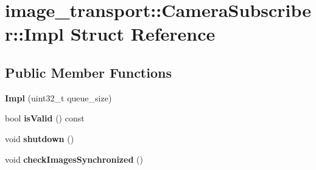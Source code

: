 \hypertarget{structimage__transport_1_1_camera_subscriber_1_1_impl}{\section{image\-\_\-transport\-:\-:Camera\-Subscriber\-:\-:Impl Struct Reference}
\label{structimage__transport_1_1_camera_subscriber_1_1_impl}
}
\subsection*{Public Member Functions}
\begin{DoxyCompactItemize}
\item 
\hypertarget{structimage__transport_1_1_camera_subscriber_1_1_impl_ac7966fd63c4fceb7933a97435d498530}{{\bfseries Impl} (uint32\-\_\-t queue\-\_\-size)}\label{structimage__transport_1_1_camera_subscriber_1_1_impl_ac7966fd63c4fceb7933a97435d498530}

\item 
\hypertarget{structimage__transport_1_1_camera_subscriber_1_1_impl_a81101052d6963d6dae362a8618834891}{bool {\bfseries is\-Valid} () const }\label{structimage__transport_1_1_camera_subscriber_1_1_impl_a81101052d6963d6dae362a8618834891}

\item 
\hypertarget{structimage__transport_1_1_camera_subscriber_1_1_impl_a1d85a3f8e64041505fc74f8057ec3dfd}{void {\bfseries shutdown} ()}\label{structimage__transport_1_1_camera_subscriber_1_1_impl_a1d85a3f8e64041505fc74f8057ec3dfd}

\item 
\hypertarget{structimage__transport_1_1_camera_subscriber_1_1_impl_ad5ba0e206cba4e67155d34bbb2a18c74}{void {\bfseries check\-Images\-Synchronized} ()}\label{structimage__transport_1_1_camera_subscriber_1_1_impl_ad5ba0e206cba4e67155d34bbb2a18c74}

\end{DoxyCompactItemize}
